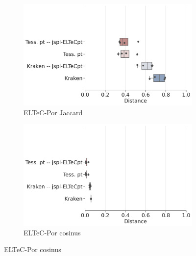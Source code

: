 \begin{figure}[h!]
   \centering
      \begin{subfigure}{0.45\textwidth}
  \includegraphics[height=.65\textwidth]{IMAGES/Boite-moustache/ELTeC-Por_REF_jaccard.png} 
        \caption{ELTeC-Por Jaccard}
        \label{fig:ELTeC-Por_REF_jaccard}
   \end{subfigure}
    \begin{subfigure}{0.5\textwidth}
  \includegraphics[height=.65\textwidth]{IMAGES/Boite-moustache/ELTeC-Por_REF_cosinus.png} 
        \caption{ELTeC-Por cosinus}
        \label{fig:ELTeC-Por_REF_cosinus}
   \end{subfigure}   
\label{fig:distance_texte}


\end{figure}
